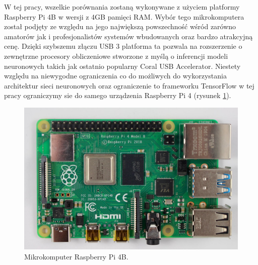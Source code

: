 W tej pracy, wszelkie porównania zostaną wykonywane z użyciem platformy Raspberry Pi 4B w wersji z 4GB pamięci RAM. Wybór tego mikrokomputera został podjęty ze względu na jego największą powszechność wśród zarówno amatorów jak i profesjonalistów systemów wbudowanych oraz bardzo atrakcyjną cenę. Dzięki szybszemu złączu USB 3 platforma ta pozwala na rozszerzenie o zewnętrzne procesory obliczeniowe stworzone z myślą o inferencji modeli neuronowych takich jak ostatnio popularny Coral USB Accelerator. Niestety  względu na niewygodne ograniczenia co do możliwych do wykorzystania architektur sieci neuronowych oraz ograniczenie to frameworku TensorFlow w tej pracy ograniczymy sie do samego urządzenia Raspberry Pi 4 (rysunek \ref{fig:raspberry}).

\begin{figure}[h]
    \centering
    \includegraphics[width=0.8\linewidth]{img/rasberry.jpeg}
    \caption{Mikrokomputer Raspberry Pi 4B.}
    \label{fig:raspberry}
\end{figure}